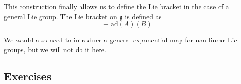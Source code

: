   \begin{definition}
    \label{def:lie-bracket-on-a-general-lie-group}
    This construction finally allows us to define the Lie bracket in the case of a general \hyperref[def:lie-group]{Lie group}. The Lie bracket on $\mathfrak{g}$ is defined as 
    \begin{equation}
      [A,B] \equiv \text{ad} (A) (B)
    \end{equation}
  \end{definition}

  We would also need to introduce a general exponential map for non-linear \hyperref[def:lie-group]{Lie groups}, but we will not do it here. 

\subsection{Exercises}


